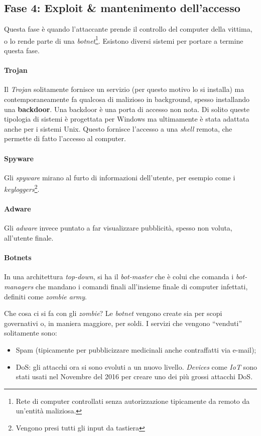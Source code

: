 \subsection{Fase 4: Exploit \& mantenimento dell'accesso}

Questa fase è quando l'attaccante prende il controllo del computer della
vittima, o lo rende parte di una \textit{botnet}\footnote{Rete di computer
controllati senza autorizzazione tipicamente da remoto da un'entità maliziosa.}.
Esistono diversi sistemi per portare a termine questa fase.

\paragraph*{Trojan} Il \textit{Trojan} solitamente fornisce un servizio (per
questo motivo lo si installa) ma contemporaneamente fa qualcosa di malizioso in
background, spesso installando una \textbf{backdoor}.
Una backdoor è una porta di accesso non nota. Di solito queste tipologia di
sistemi è progettata per Windows ma ultimamente è stata adattata anche per i
sistemi Unix. Questo fornisce l'accesso a una \textit{shell} remota, che
permette di fatto l'accesso al computer.

\paragraph*{Spyware} Gli \textit{spyware} mirano al furto di informazioni
dell'utente, per esempio come i \textit{keyloggers}\footnote{Vengono presi tutti
gli input da tastiera}.

\paragraph*{Adware} Gli \textit{adware} invece puntato a far visualizzare
pubblicità, spesso non voluta, all'utente finale.

\paragraph*{Botnets}

In una architettura \textit{top-down}, si ha il \textit{bot-master} che è colui
che comanda i \textit{bot-managers} che mandano i comandi finali all'insieme
finale di computer infettati, definiti come \textit{zombie army}.

Che cosa ci si fa con gli \textit{zombie}? Le \textit{botnet} vengono create
sia per scopi governativi o, in maniera maggiore, per soldi. I servizi che
vengono ``venduti'' solitamente sono:
\begin{itemize}
\item Spam (tipicamente per pubblicizzare medicinali anche contraffatti via
e-mail);
\item DoS: gli attacchi ora si sono evoluti a un nuovo livello. \textit{Devices}
come \textit{IoT} sono stati usati nel Novembre del 2016 per creare uno dei più
grossi attacchi DoS.
\end{itemize}

